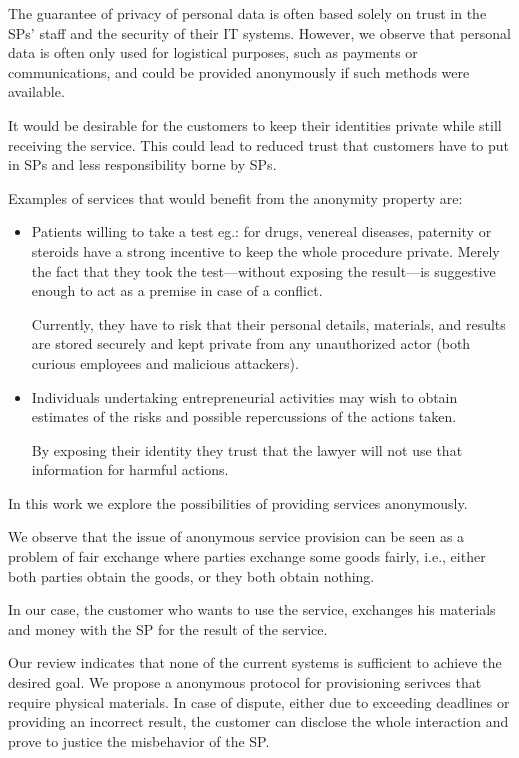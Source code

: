 The guarantee of privacy of personal data is often based solely on trust in the SPs' staff and the security of their IT systems. However, we observe that personal data is often only used for logistical purposes, such as payments or communications, and could be provided anonymously if such methods were available.

It would be desirable for the customers to keep their identities private while still receiving the service. This could lead to reduced trust that customers have to put in SPs and less responsibility borne by SPs.

Examples of services that would benefit from the anonymity property are:
\begin{itemize}
    \item Patients willing to take a test eg.: for drugs, venereal diseases, paternity or steroids have a strong incentive to keep the whole procedure private. Merely the fact that they took the test—without exposing the result—is suggestive enough to act as a premise in case of a conflict.

Currently, they have to risk that their personal details, materials, and results are stored securely and kept private from any unauthorized actor (both curious employees and malicious attackers).

\item Individuals undertaking entrepreneurial activities may wish to obtain estimates of the risks and possible repercussions of the actions taken.

By exposing their identity they trust that the lawyer will not use that information for harmful actions.
\end{itemize}

In this work we explore the possibilities of providing services anonymously.

We observe that the issue of anonymous service provision can be seen as a problem of fair exchange where parties exchange some goods fairly, i.e., either both parties obtain the goods, or they both obtain nothing.

In our case, the customer who wants to use the service, exchanges his materials and money with the SP for the result of the service.

Our review indicates that none of the current systems is sufficient to achieve the desired goal. We propose a anonymous protocol for provisioning serivces that require physical materials. In case of dispute, either due to exceeding deadlines or providing an incorrect result, the customer can disclose the whole interaction and prove to justice the misbehavior of the SP.

